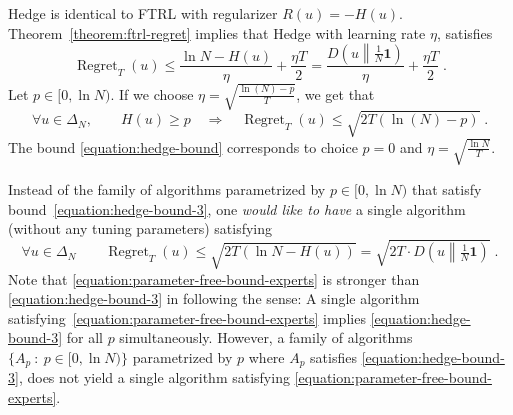 \documentclass{colt2016} %
\DeclareMathOperator{\Regret}{Regret}
\newcommand{\KL}[2]{D\left({#1}\middle\|{#2}\right)}  %
\newcommand{\indicator}{\mathbf{1}}
\begin{document}
Hedge is identical to FTRL with regularizer $R(u) = -H(u)$.
Theorem~\ref{theorem:ftrl-regret} implies that Hedge with learning rate $\eta$, satisfies
\begin{equation}
\label{equation:hedge-bound-2}
\Regret_T(u) \le \frac{\ln N - H(u)}{\eta} + \frac{\eta T}{2} = \frac{\KL{u}{\frac{1}{N}\indicator}}{\eta} + \frac{\eta T}{2} \; .
\end{equation}
Let $p \in [0, \ln N)$. If we choose $\eta = \sqrt{\frac{\ln(N) - p}{T}}$, we get that
\begin{equation}
\label{equation:hedge-bound-3}
\forall u \in \Delta_N, \qquad H(u) \ge p \quad \Longrightarrow \quad \Regret_T(u) \le \sqrt{2 T (\ln(N) - p)} \; .
\end{equation}
The bound \eqref{equation:hedge-bound} corresponds to choice $p=0$ and
$\eta=\sqrt{\frac{\ln N}{T}}$.

Instead of the family of algorithms parametrized by $p \in [0,\ln N)$ that
satisfy bound~\eqref{equation:hedge-bound-3}, one \emph{would like to have} a single
algorithm (without any tuning parameters) satisfying
\begin{equation}
\label{equation:parameter-free-bound-experts}
\forall u \in \Delta_N \qquad \Regret_T(u) \le \sqrt{2 T (\ln N - H(u))} = \sqrt{2T \cdot \KL{u}{\tfrac{1}{N} \indicator}} \; .
\end{equation}
Note that \eqref{equation:parameter-free-bound-experts} is stronger than
\eqref{equation:hedge-bound-3} in following the sense: A single algorithm
satisfying~\eqref{equation:parameter-free-bound-experts} implies
\eqref{equation:hedge-bound-3} for all $p$ simultaneously. However, a family
of algorithms $\{A_p ~:~ p \in [0,\ln N)\}$ parametrized by $p$ where $A_p$
satisfies \eqref{equation:hedge-bound-3}, does not yield a single
algorithm satisfying \eqref{equation:parameter-free-bound-experts}.
\end{document}
